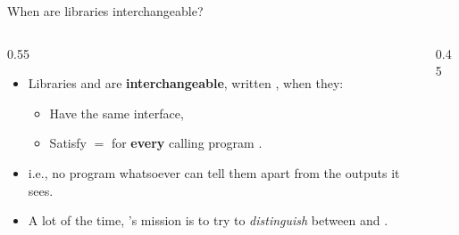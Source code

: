 \ifdefined\PRESENTATION\else\PassOptionsToClass{handout}{beamer}\fi\documentclass[aspectratio=169, lualatex]{beamer}
\begin{document}
\begin{frame}{When are libraries interchangeable?}
	\begin{columns}[c]
		\begin{column}{0.55\textwidth}
			\begin{itemize}
				\item Libraries  and  are \textbf{interchangeable}, written  \interchangeable{} , when they:
				      \begin{itemize}
					      \item Have the same interface,
					      \item Satisfy  $=$  for \textbf{every} calling program \prog{}.
				      \end{itemize}
				\item i.e., no program whatsoever can tell them apart from the outputs it sees.
				\item A lot of the time, \prog{}'s mission is to try to \textit{distinguish} between  and .
			\end{itemize}
		\end{column}
		\begin{column}{0.45\textwidth}
			\begin{flushright}
			\end{flushright}
		\end{column}
	\end{columns}
\end{frame}
\end{document}
